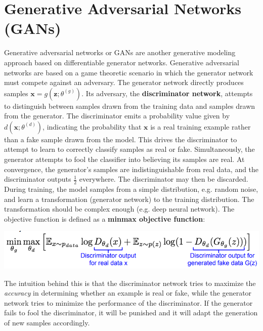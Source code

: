 \section{Generative Adversarial Networks (GANs)}
Generative adversarial networks or GANs are another generative modeling approach based on differentiable generator networks.\newline\newline
Generative adversarial networks are based on a game theoretic scenario in which the generator network must compete against an adversary. The generator network directly produces samples $\textbf{x} = g(\textbf{z}; \theta^{(g)})$. Its adversary, the \textbf{discriminator network}, attempts to distinguish between samples drawn from the training data and samples drawn from the generator. The discriminator emits a probability value given by $d(\textbf{x}; \theta^{(d)})$, indicating the probability that $\textbf{x}$ is a real training example rather than a fake sample drawn from the model.\newline\newline
This drives the discriminator to attempt to learn to correctly classify samples as real or fake. Simultaneously, the generator attempts to fool the classifier into believing its samples are real. At convergence, the generator’s samples are indistinguishable from real data, and the discriminator outputs $\frac{1}{2}$ everywhere. The discriminator may then be discarded.\newline\newline
During training, the model samples from a simple distribution, e.g. random noise, and learn a transformation (generator network) to the training distribution. The transformation should be complex enough (e.g. deep neural network).\newline\newline
The objective function is defined as a \textbf{minmax objective function}:
\begin{center}
    \includegraphics[scale=0.6]{images/GAN.png}
\end{center}
The intuition behind this is that the discriminator network tries to maximize the \textit{accuracy} in determining whether an example is real or fake, while the generator network tries to minimize the performance of the discriminator. If the generator fails to fool the discriminator, it will be punished and it will adapt the generation of new samples accordingly.\newline\newline

